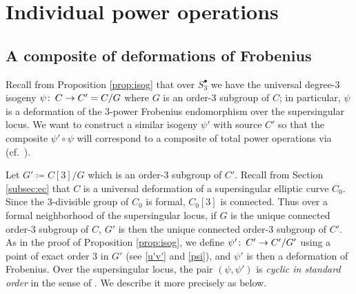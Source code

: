\documentclass{gtpart}
\theoremstyle{definition}
\theoremstyle{remark}
\def\co{\colon\thinspace}
\newcommand{\s}{S^\bullet}
\begin{document}
\section{Individual power operations}
\label{sec:individual}

\subsection{A composite of deformations of Frobenius}

Recall from Proposition \ref{prop:isog} that over $\s_3$ we have the 
universal degree-3 isogeny $\psi \co C \to C' = C/G$ where $G$ is an 
order-3 subgroup of $C$; in particular, $\psi$ is a deformation of the 
3-power Frobenius endomorphism over the supersingular locus.  We want to 
construct a similar isogeny $\psi'$ with source $C'$ so that the 
composite $\psi' \circ \psi$ will correspond to a composite of total 
power operations via \cite[Theorem B]{cong} (cf.~\cite[11.3.1]{KM}).  

Let $G' \coloneqq C[3]/G$ which is an order-3 subgroup of $C'$.  Recall 
from Section \ref{subsec:ec} that $C$ is a universal deformation of a 
supersingular elliptic curve $C_0$.  Since the 3-divisible group of 
$C_0$ is formal, $C_0[3]$ is connected.  Thus over a formal neighborhood 
of the supersingular locus, if $G$ is the unique connected order-3 
subgroup of $C$, $G'$ is then the unique connected order-3 subgroup of 
$C'$.  As in the proof of Proposition \ref{prop:isog}, we define 
$\psi' \co C' \to C'/G'$ using a point of exact order 3 in $G'$ (see 
\eqref{u'v'} and \eqref{psi}), and $\psi'$ is then a deformation of 
Frobenius.  Over the supersingular locus, the pair $(\psi, \psi')$ is 
{\em cyclic in standard order} in the sense of \cite[6.7.7]{KM}.  We 
describe it more precisely as below.  
\end{document}
